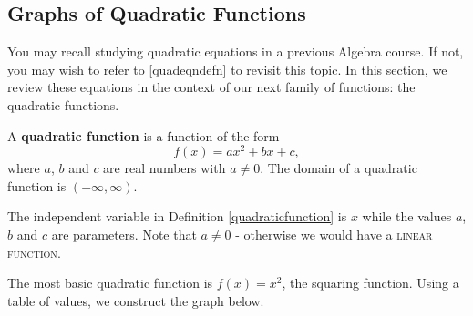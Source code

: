 \documentclass{ximera}
\begin{document}
	\author{Stitz-Zeager}




\setcounter{footnote}{0}

\label{QuadraticFunctions}

\subsection{Graphs of Quadratic Functions}
\label{GraphsofQuadraticFunctions}


You may recall studying quadratic equations in a previous Algebra course.  If not, you may wish to refer to \ref{quadeqndefn} to revisit this topic. In this section, we review these equations in the context of our next family of functions: the quadratic functions.



\begin{definition} \label{quadraticfunction} A \textbf{quadratic function} is a function of the form \[ f(x) = ax^2 + bx + c,\] where $a$, $b$ and $c$ are real numbers with $a \neq 0$.  The domain of a quadratic function is $(-\infty, \infty)$.

\end{definition}


\medskip

The independent variable in Definition \ref{quadraticfunction} is $x$ while the  values $a$, $b$ and $c$ are parameters. Note that $a \neq 0$ - otherwise we would have a \textsc{linear function}.


The most basic quadratic function is $f(x) = x^2$, the squaring function.  Using a table of values, we construct the graph below. 
\end{document}

